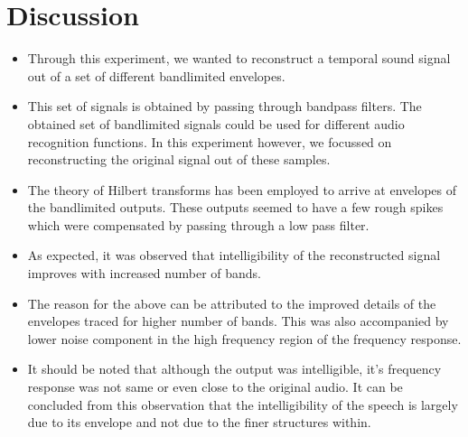 \documentclass[a4paper,10pt]{article}
\begin{document}
	
\section*{Discussion}
\begin{itemize}
\item{Through this experiment, we wanted to reconstruct a temporal sound signal out of a set of different bandlimited envelopes.}
\item{This set of signals is obtained by passing through bandpass filters. The obtained set of bandlimited signals could be used for different audio recognition functions. In this experiment however, we focussed on reconstructing the original signal out of these samples.}
\item{The theory of Hilbert transforms has been employed to arrive at envelopes of the bandlimited outputs. These outputs seemed to have a few rough spikes which were compensated by passing through a low pass filter.}
\item{As expected, it was observed that intelligibility of the reconstructed signal improves with increased number of bands.}
\item{The reason for the above can be attributed to the improved details of the envelopes traced for higher number of bands. This was also accompanied by lower noise component in the high frequency region of the frequency response.}
\item{It should be noted that although the output was intelligible, it's frequency response was not same or even close to the original audio. It can be concluded from this observation that the intelligibility of the speech is largely due to its envelope and not due to the finer structures within.}
\end{itemize}

\pagebreak
\end{document}
